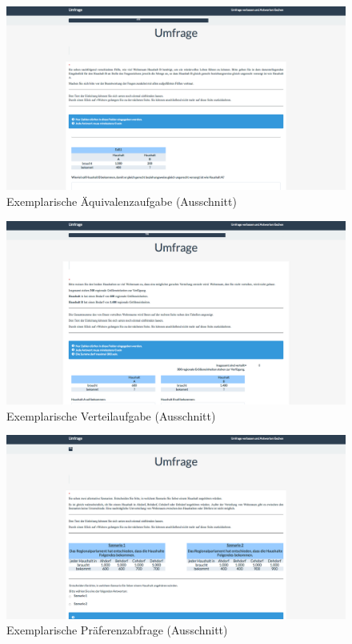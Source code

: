 \documentclass[a4paper]{thesis}
\begin{document}
\begin{figure}[H]
\centering
\includegraphics[width=1\textwidth]{figures/lime_11.png}
\caption[Exemplarische Äquivalenzaufgabe (Ausschnitt)]{Exemplarische Äquivalenzaufgabe (Ausschnitt)}
\end{figure}

\begin{figure}[H]
\centering
\includegraphics[width=1\textwidth]{figures/lime_12.png}
\caption[Exemplarische Verteilaufgabe (Ausschnitt)]{Exemplarische Verteilaufgabe (Ausschnitt)}
\end{figure}

\begin{figure}[H]
\centering
\includegraphics[width=1\textwidth]{figures/lime_13.png}
\caption[Exemplarische Präferenzabfrage (Ausschnitt)]{Exemplarische Präferenzabfrage (Ausschnitt)}
\end{figure}
\end{document}
